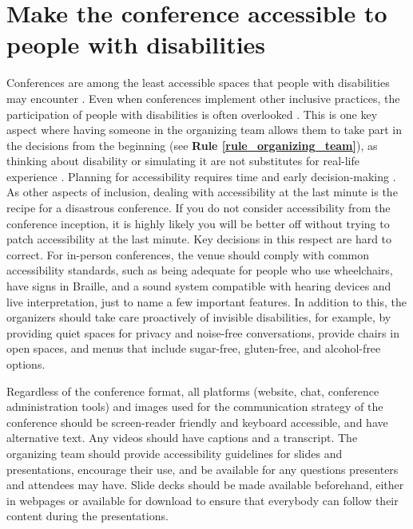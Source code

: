 \documentclass[10pt,letterpaper]{article}
\begin{document}
\section{Make the conference accessible to people with disabilities}
\label{rule_accessibility}


Conferences are among the least accessible spaces that people with disabilities may encounter \cite{priceAccessImaginedConstruction2009}. Even when conferences implement other inclusive practices, the participation of people with disabilities is often overlooked \cite{marks2021meeting}. This is one key aspect where having someone in the organizing team allows them to take part in the decisions from the beginning (see \textbf{Rule \ref{rule_organizing_team}}), as thinking about disability or simulating it are not substitutes for real-life experience \cite{costanzachockDesign2020}. Planning for accessibility requires time and early decision-making \cite{irishIncreasingParticipationUsing2020}. As other aspects of inclusion, dealing with accessibility at the last minute is the recipe for a disastrous conference. If you do not consider accessibility from the conference inception, it is highly likely you will be better off without trying to patch accessibility at the last minute. Key decisions in this respect are hard to correct. 
For in-person conferences, the venue should comply with common accessibility standards, such as being adequate for people who use wheelchairs, have signs in Braille, and a sound system compatible with hearing devices and live interpretation, just to name a few important features. In addition to this, the organizers should take care proactively of invisible disabilities, for example, by providing quiet spaces for privacy and noise-free conversations, provide chairs in open spaces, and menus that include sugar-free, gluten-free, and alcohol-free options.

Regardless of the conference format, all platforms (website, chat, conference administration tools) and images used for the communication strategy of the conference should be screen-reader friendly and keyboard accessible, and have alternative text. Any videos should have captions and a transcript. The organizing team should provide accessibility guidelines for slides and presentations, encourage their use, and be available for any questions presenters and attendees may have. Slide decks should be made available beforehand, either in webpages or available for download to ensure that everybody can follow their content during the presentations. 
\end{document}
